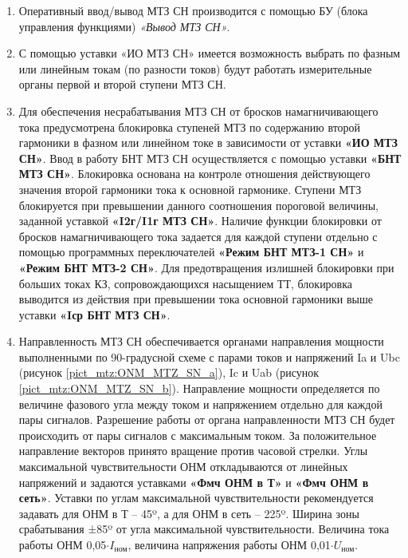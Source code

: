 \begin{enumerate}[label=\arabic{section}.\arabic{subsection}.\arabic*,  align=left, labelsep=4pt, leftmargin=0pt, itemindent=57pt]
\item
Оперативный ввод/вывод МТЗ СН производится с помощью БУ (блока управления функциями) \textit{«Вывод МТЗ СН»}. 

\item
С помощью уставки «ИО МТЗ СН» имеется возможность выбрать по фазным или линейным токам (по разности токов) будут работать измерительные органы первой и второй ступени МТЗ СН. 

\item
Для обеспечения несрабатывания МТЗ СН от бросков намагничивающего тока предусмотрена блокировка ступеней МТЗ по содержанию второй гармоники в фазном или линейном токе в зависимости от уставки \textbf{«ИО МТЗ СН»}. Ввод в работу БНТ МТЗ СН осуществляется с помощью уставки \textbf{«БНТ МТЗ СН»}. Блокировка основана на контроле отношения действующего значения второй гармоники тока к основной гармонике. Ступени МТЗ блокируется при превышении данного соотношения пороговой величины, заданной уставкой \textbf{«I2г/I1г МТЗ СН»}. Наличие функции блокировки от бросков намагничивающего тока задается для каждой ступени отдельно с помощью программных переключателей \textbf{«Режим БНТ МТЗ-1 СН»} и \textbf{«Режим БНТ МТЗ-2 СН»}. Для предотвращения излишней блокировки при больших токах КЗ, сопровождающихся насыщением ТТ, блокировка выводится из действия при превышении тока основной гармоники выше уставки \textbf{«Iср БНТ МТЗ СН»}.

\item
Направленность МТЗ СН обеспечивается органами направления мощности выполненными по 90-градусной схеме с парами токов и напряжений Ia и Ubc (рисунок \ref{pict_mtz:ONM_MTZ_SN_a}), Ic и Uab (рисунок \ref{pict_mtz:ONM_MTZ_SN_b}). Направление мощности определяется по величине фазового угла между током и напряжением отдельно для каждой пары сигналов. Разрешение работы от органа направленности МТЗ СН будет происходить от пары сигналов с максимальным током. За положительное направление векторов принято вращение против часовой стрелки. Углы максимальной чувствительности ОНМ откладываются от линейных напряжений и задаются уставками \textbf{«Фмч ОНМ в Т»} и \textbf{«Фмч ОНМ в сеть»}. Уставки по углам максимальной чувствительности рекомендуется задавать для ОНМ в Т – 45º, а для ОНМ в сеть – 225º. Ширина зоны срабатывания ±85º от угла максимальной чувствительности. Величина тока работы ОНМ 0,05$ \cdot I_{\text{ном}}$, величина напряжения работы ОНМ 0,01$ \cdot U_{\text{ном}}$.


\end{enumerate}
